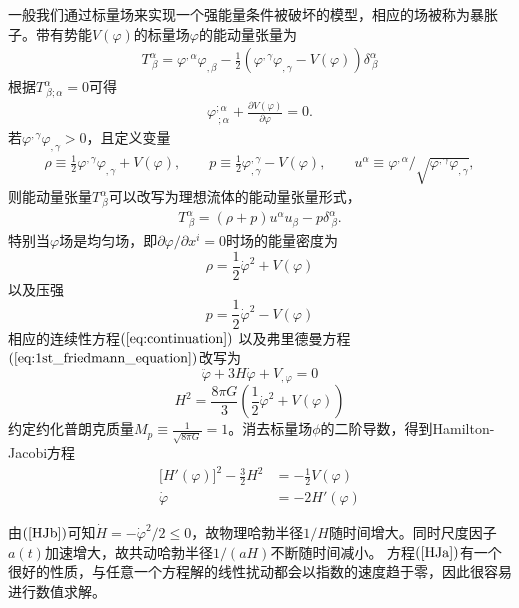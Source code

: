 一般我们通过标量场来实现一个强能量条件被破坏的模型，相应的场被称为暴胀子。带有势能$V(\varphi)$的标量场$\varphi$的能动量张量为
\begin{align}
  \label{eq:scalar-energy-momentum-tensor}
  T^{\alpha}_{\ \beta} = \varphi^{,\alpha}\varphi_{,\beta}-
  \frac{1}{2}{\left(\varphi^{,\gamma}\varphi_{,\gamma}-V(\varphi)\right)}\delta^{\alpha}_{\ \beta}
\end{align}
根据$T^{\alpha}_{\ \beta;\alpha}=0$可得
\begin{align}
  \varphi^{;\alpha}_{\ ;\alpha}+\frac{\partial V(\varphi)}{\partial\varphi}
  =0.
\end{align}
若$\varphi^{,\gamma}\varphi_{,\gamma}>0$，且定义变量
\begin{align}
  \rho \equiv
  \frac{1}{2}\varphi^{,\gamma}\varphi_{,\gamma}+V(\varphi),\qquad 
  p\equiv \frac{1}{2}\varphi^{,\gamma}_{,\gamma}-V(\varphi),\qquad
  u^{\alpha}\equiv \varphi^{,\alpha}/
  \sqrt{\varphi^{,\gamma}\varphi_{,\gamma}},
\end{align}
则能动量张量$T^{\alpha}_{\
\beta}$可以改写为理想流体的能动量张量形式，
\begin{align}
  \label{eq:perfect-fluid-energy-momentum-tensor}
  T^{\alpha}_{\ \beta}=(\rho+p)u^{\alpha}u_{\beta}-p\delta^{\alpha}_{\
  \beta}.
\end{align}
特别当$\varphi$场是均匀场，即$\partial\varphi /\partial x^{i}=0$时场的能量密度为
\begin{equation}\label{eq:energy_density}
  \rho = \frac{1}{2}\dot{\varphi}^2+V(\varphi)
\end{equation}
以及压强
\begin{equation}\label{eq:pressure}
  p=\frac{1}{2}\dot{\varphi}^2-V(\varphi)
\end{equation}
相应的连续性方程$(\ref{eq:continuation})$
以及弗里德曼方程$(\ref{eq:1st_friedmann_equation})$改写为
\begin{equation}
  \ddot{\varphi}+3H\dot\varphi+V_{,\varphi}=0
\end{equation}
\begin{equation}
  H^2=\frac{8\pi G}{3}\left(\frac{1}{2}\dot\varphi^2+V(\varphi)\right)
\end{equation}
约定约化普朗克质量$M_p\equiv\frac{1}{\sqrt{8\pi G}}=1$。消去标量场$\phi$的二阶导数，得到Hamilton-Jacobi方程
\begin{align}
  \lbrack H'(\varphi)\rbrack^2 - \frac{3}{2}H^2 &=
  -\frac{1}{2}V(\varphi)\label{HJa} \\
  \dot\varphi  &= -2H'(\varphi)\label{HJb}
\end{align}

由$(\ref{HJb})$可知$\dot H=-\dot \varphi^2/2\leq 0$，故物理哈勃半径$1/H$随时间增大。同时尺度因子$a(t)$加速增大，故共动哈勃半径$1/(aH)$不断随时间减小。
方程$(\ref{HJa})$有一个很好的性质，与任意一个方程解的线性扰动都会以指数的速度趋于零，因此很容易进行数值求解。
